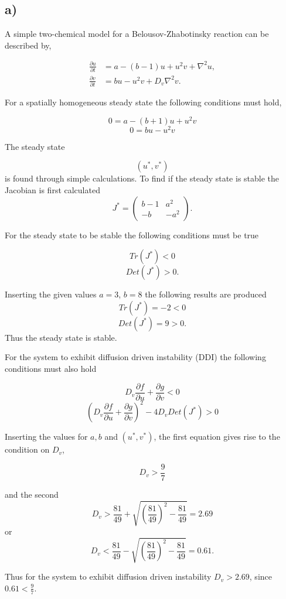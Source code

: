 \subsection*{a)}

A simple two-chemical model for a Belousov-Zhabotinsky reaction can be described by,

\begin{align}
\label{eq:2a}
\frac{\partial u}{\partial t}& = a - (b-1)u + u^2v + \nabla^2 u,\\
\frac{\partial v}{\partial t}& = bu - u^2v + D_v \nabla^2 v.
\end{align}

For a spatially homogeneous steady state the following conditions must hold,

$$0 = a - (b+1)u + u^2v$$
$$0 = bu - u^2v$$

The steady state 

$$
(u^*,v^*)
$$
is found through simple calculations. To find if the steady state is stable the Jacobian is first calculated
$$J^* = \left(
\begin{array}{cc}
    b-1 & a^2 \\
    -b  & -a^2
\end{array}
\right).$$

For the steady state to be stable the following conditions must be true

$$Tr(J^*) < 0$$
$$Det(J^*) > 0.$$

Inserting the given values $a=3$, $b=8$ the following results are produced
$$Tr(J^*) = -2 < 0$$
$$Det(J^*) = 9 > 0.$$
Thus the steady state is stable.

For the system to exhibit diffusion driven instability (DDI) the following conditions must also hold

$$D_v \frac{\partial f}{\partial u} + \frac{\partial g}{\partial v} < 0$$
$$(D_v \frac{\partial f}{\partial u}+ \frac{\partial g}{\partial v})^2 - 4D_v Det(J^*) > 0$$

Inserting the values for $a, b$ and $(u^*, v^*)$, the first equation gives rise to the condition on $D_v$,

$$D_v > \frac{9}{7}$$

and the second
$$D_v > \frac{81}{49} + \sqrt{\left(\frac{81}{49}\right)^2 - \frac{81}{49}} = 2.69$$
or
$$D_v < \frac{81}{49} - \sqrt{\left(\frac{81}{49}\right)^2 - \frac{81}{49}} = 0.61.$$

Thus for the system to exhibit diffusion driven instability $D_v > 2.69$, since $0.61 < \frac{9}{7}$.


